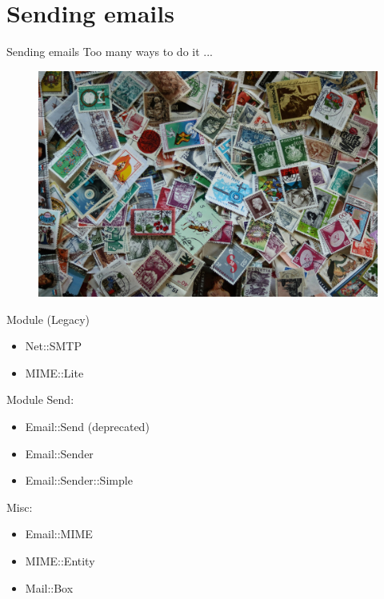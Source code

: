 \section{Sending emails}

\begin{frame}{Sending emails}
  Too many ways to do it ...
  \begin{figure}[!ht]
    \centering
    \includegraphics[width=0.9\linewidth]{img/wealth-3262562_1920.jpg}
  \end{figure}
\end{frame}

\begin{frame}{Module (Legacy)}
  \begin{itemize}
    \item Net::SMTP
    \item MIME::Lite
  \end{itemize}
\end{frame}

\begin{frame}{Module}
  Send:

  \begin{itemize}
  \item Email::Send (deprecated)
  \item Email::Sender
  \item Email::Sender::Simple
  \end{itemize}

  Misc:

  \begin{itemize}
  \item Email::MIME
  \item MIME::Entity
  \item Mail::Box
  \end{itemize}

\end{frame}

